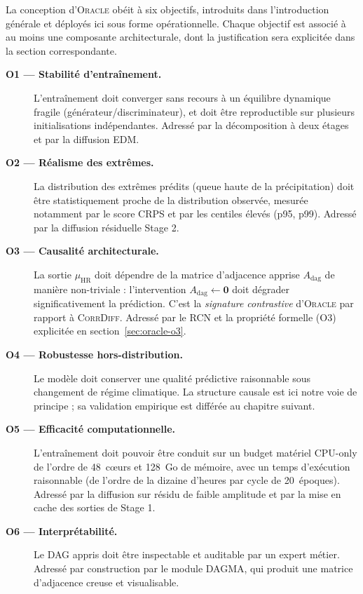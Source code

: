 \documentclass[14pt,a4paper,openany]{extreport}
\theoremstyle{definition}
\newcommand{\Oracle}{\textsc{Oracle}}
\newcommand{\CorrDiff}{\textsc{CorrDiff}}
\newcommand{\HR}{\ensuremath{\text{HR}}}
\newcommand{\muHR}{\ensuremath{\mu_{\HR}}}
\newcommand{\Adag}{\ensuremath{A_{\mathrm{dag}}}}
\begin{document}
La conception d'\Oracle{} obéit à six objectifs, introduits dans l'introduction générale et déployés ici sous forme opérationnelle. Chaque objectif est associé à au moins une composante architecturale, dont la justification sera explicitée dans la section correspondante.

\begin{description}
  \item[\textbf{O1 --- Stabilité d'entraînement.}] L'entraînement doit converger sans recours à un équilibre dynamique fragile (générateur/discriminateur), et doit être reproductible sur plusieurs initialisations indépendantes. Adressé par la décomposition à deux étages et par la diffusion EDM.
  \item[\textbf{O2 --- Réalisme des extrêmes.}] La distribution des extrêmes prédits (queue haute de la précipitation) doit être statistiquement proche de la distribution observée, mesurée notamment par le score CRPS et par les centiles élevés (p95, p99). Adressé par la diffusion résiduelle Stage 2.
  \item[\textbf{O3 --- Causalité architecturale.}] La sortie $\muHR$ doit dépendre de la matrice d'adjacence apprise $\Adag$ de manière non-triviale : l'intervention $\Adag \leftarrow \mathbf{0}$ doit dégrader significativement la prédiction. C'est la \emph{signature contrastive} d'\Oracle{} par rapport à \CorrDiff{}. Adressé par le RCN et la propriété formelle (O3) explicitée en section~\ref{sec:oracle-o3}.
  \item[\textbf{O4 --- Robustesse hors-distribution.}] Le modèle doit conserver une qualité prédictive raisonnable sous changement de régime climatique. La structure causale est ici notre voie de principe ; sa validation empirique est différée au chapitre suivant.
  \item[\textbf{O5 --- Efficacité computationnelle.}] L'entraînement doit pouvoir être conduit sur un budget matériel CPU-only de l'ordre de 48~cœurs et 128~Go de mémoire, avec un temps d'exécution raisonnable (de l'ordre de la dizaine d'heures par cycle de 20~époques). Adressé par la diffusion sur résidu de faible amplitude et par la mise en cache des sorties de Stage 1.
  \item[\textbf{O6 --- Interprétabilité.}] Le DAG appris doit être inspectable et auditable par un expert métier. Adressé par construction par le module DAGMA, qui produit une matrice d'adjacence creuse et visualisable.
\end{description}

\end{document}
